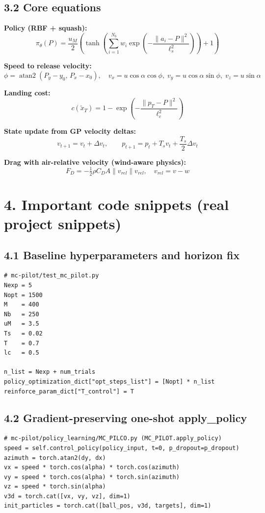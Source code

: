 \documentclass[11pt]{article}
\begin{document}
\subsection*{3.2 Core equations}
\textbf{Policy (RBF + squash):}
\[
\pi_{\theta}(P)=\frac{u_M}{2}\left(\tanh\!\left(\sum_{i=1}^{N_b}w_i\exp\!\left(-\frac{\|a_i-P\|^2}{\ell_s^2}\right)\right)+1\right)
\]

\textbf{Speed to release velocity:}
\[
\phi=\operatorname{atan2}(P_y-y_0,\,P_x-x_0),\quad
v_x=u\cos\alpha\cos\phi,\;v_y=u\cos\alpha\sin\phi,\;v_z=u\sin\alpha
\]

\textbf{Landing cost:}
\[
c(\tilde{x}_T)=1-\exp\!\left(-\frac{\|p_T-P\|^2}{\ell_c^2}\right)
\]

\textbf{State update from GP velocity deltas:}
\[
v_{t+1}=v_t+\Delta v_t,\qquad
p_{t+1}=p_t+T_s v_t+\frac{T_s}{2}\Delta v_t
\]

\textbf{Drag with air-relative velocity (wind-aware physics):}
\[
F_D=-\tfrac{1}{2}\rho C_D A\|v_{rel}\|v_{rel},\quad v_{rel}=v-w
\]

\section*{4. Important code snippets (real project snippets)}
\subsection*{4.1 Baseline hyperparameters and horizon fix}
\begin{lstlisting}[style=py]
# mc-pilot/test_mc_pilot.py
Nexp = 5
Nopt = 1500
M    = 400
Nb   = 250
uM   = 3.5
Ts   = 0.02
T    = 0.7
lc   = 0.5

n_list = Nexp + num_trials
policy_optimization_dict["opt_steps_list"] = [Nopt] * n_list
reinforce_param_dict["T_control"] = T
\end{lstlisting}

\subsection*{4.2 Gradient-preserving one-shot apply\_policy}
\begin{lstlisting}[style=py]
# mc-pilot/policy_learning/MC_PILCO.py (MC_PILOT.apply_policy)
speed = self.control_policy(policy_input, t=0, p_dropout=p_dropout)
azimuth = torch.atan2(dy, dx)
vx = speed * torch.cos(alpha) * torch.cos(azimuth)
vy = speed * torch.cos(alpha) * torch.sin(azimuth)
vz = speed * torch.sin(alpha)
v3d = torch.cat([vx, vy, vz], dim=1)
init_particles = torch.cat([ball_pos, v3d, targets], dim=1)
\end{lstlisting}
\end{document}
